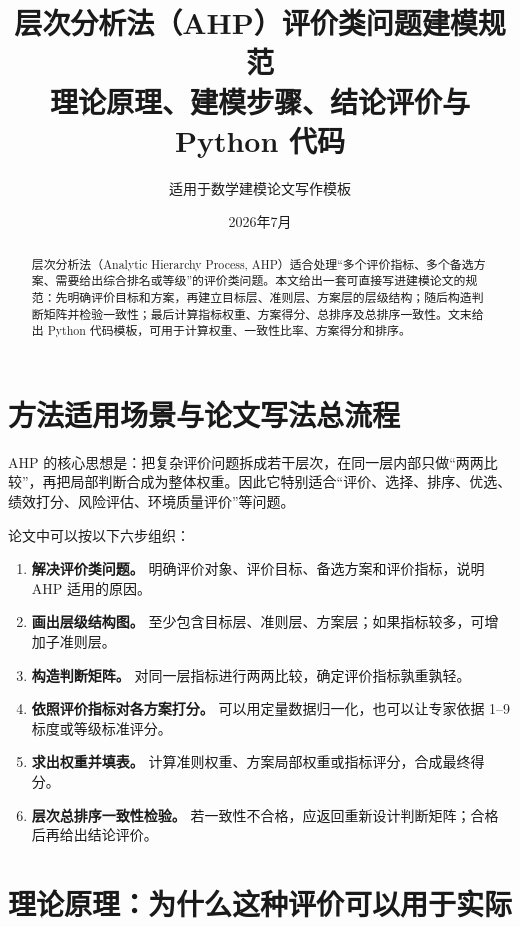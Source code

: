 \documentclass[UTF8,zihao=-4,fontset=none]{ctexart}
\title{层次分析法（AHP）评价类问题建模规范\\\large 理论原理、建模步骤、结论评价与 Python 代码}
\author{适用于数学建模论文写作模板}
\date{2026年7月}
\begin{document}
\maketitle
\begin{abstract}
层次分析法（Analytic Hierarchy Process, AHP）适合处理“多个评价指标、多个备选方案、需要给出综合排名或等级”的评价类问题。本文给出一套可直接写进建模论文的规范：先明确评价目标和方案，再建立目标层、准则层、方案层的层级结构；随后构造判断矩阵并检验一致性；最后计算指标权重、方案得分、总排序及总排序一致性。文末给出 Python 代码模板，可用于计算权重、一致性比率、方案得分和排序。
\end{abstract}

\tableofcontents
\newpage

\section{方法适用场景与论文写法总流程}
AHP 的核心思想是：把复杂评价问题拆成若干层次，在同一层内部只做“两两比较”，再把局部判断合成为整体权重。因此它特别适合“评价、选择、排序、优选、绩效打分、风险评估、环境质量评价”等问题。

论文中可以按以下六步组织：
\begin{enumerate}[label=Step\arabic*：,leftmargin=3.2em]
  \item \textbf{解决评价类问题。} 明确评价对象、评价目标、备选方案和评价指标，说明 AHP 适用的原因。
  \item \textbf{画出层级结构图。} 至少包含目标层、准则层、方案层；如果指标较多，可增加子准则层。
  \item \textbf{构造判断矩阵。} 对同一层指标进行两两比较，确定评价指标孰重孰轻。
  \item \textbf{依照评价指标对各方案打分。} 可以用定量数据归一化，也可以让专家依据 1--9 标度或等级标准评分。
  \item \textbf{求出权重并填表。} 计算准则权重、方案局部权重或指标评分，合成最终得分。
  \item \textbf{层次总排序一致性检验。} 若一致性不合格，应返回重新设计判断矩阵；合格后再给出结论评价。
\end{enumerate}

\section{理论原理：为什么这种评价可以用于实际}
\end{document}

